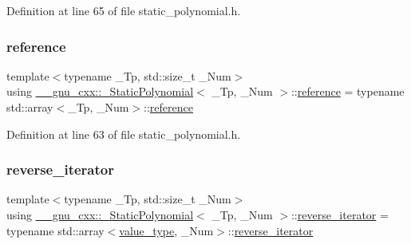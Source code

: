 Definition at line 65 of file static\+\_\+polynomial.\+h.

\mbox{\label{class____gnu__cxx_1_1__StaticPolynomial_a280562caf2d2f392b5b73cac1e64e8ed}} 
\subsubsection{\texorpdfstring{reference}{reference}}
{\footnotesize\ttfamily template$<$typename \+\_\+\+Tp, std\+::size\+\_\+t \+\_\+\+Num$>$ \\
using \hyperlink{class____gnu__cxx_1_1__StaticPolynomial}{\+\_\+\+\_\+gnu\+\_\+cxx\+::\+\_\+\+Static\+Polynomial}$<$ \+\_\+\+Tp, \+\_\+\+Num $>$\+::\hyperlink{class____gnu__cxx_1_1__StaticPolynomial_a280562caf2d2f392b5b73cac1e64e8ed}{reference} =  typename std\+::array$<$\+\_\+\+Tp, \+\_\+\+Num$>$\+::\hyperlink{class____gnu__cxx_1_1__StaticPolynomial_a280562caf2d2f392b5b73cac1e64e8ed}{reference}}



Definition at line 63 of file static\+\_\+polynomial.\+h.

\mbox{\label{class____gnu__cxx_1_1__StaticPolynomial_ab6a9fab0cd102db2a5bfd00fe9f35e4d}} 
\subsubsection{\texorpdfstring{reverse\+\_\+iterator}{reverse\_iterator}}
{\footnotesize\ttfamily template$<$typename \+\_\+\+Tp, std\+::size\+\_\+t \+\_\+\+Num$>$ \\
using \hyperlink{class____gnu__cxx_1_1__StaticPolynomial}{\+\_\+\+\_\+gnu\+\_\+cxx\+::\+\_\+\+Static\+Polynomial}$<$ \+\_\+\+Tp, \+\_\+\+Num $>$\+::\hyperlink{class____gnu__cxx_1_1__StaticPolynomial_ab6a9fab0cd102db2a5bfd00fe9f35e4d}{reverse\+\_\+iterator} =  typename std\+::array$<$\hyperlink{class____gnu__cxx_1_1__StaticPolynomial_af23110f5a002cd6caa3542df7cf35284}{value\+\_\+type}, \+\_\+\+Num$>$\+::\hyperlink{class____gnu__cxx_1_1__StaticPolynomial_ab6a9fab0cd102db2a5bfd00fe9f35e4d}{reverse\+\_\+iterator}}



